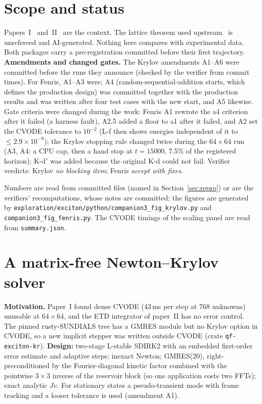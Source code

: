 \documentclass[11pt,a4paper]{article}
\begin{document}
\section{Scope and status}

\begin{keybox}
Papers~I~\cite{CallensI} and~II~\cite{CallensII} are the context. The lattice theorem used upstream~\cite{OpenAI2026} is unrefereed and
AI-generated. Nothing here compares with experimental data. Both packages carry a pre-registration committed before their first
trajectory. \textbf{Amendments and changed gates.} The Krylov amendments A1--A6 were committed before the runs they announce (checked by
the verifier from commit times). For Fenris, A1--A3 were; A4 (random-sequential-addition starts, which defines the production design) was
committed together with the production results and was written after four test cases with the new start, and A5 likewise. Gate criteria
were changed during the work: Fenris A1 rewrote the a4 criterion after it failed (a harness fault), A2.5 added a floor to a1 after it
failed, and A2 set the CVODE tolerance to $10^{-2}$ (L-f then shows energies independent of it to $\le2.9\times10^{-9}$); the Krylov
stopping rule changed twice during the $64\times64$ run (A3, A4: a CPU cap, then a hand stop at $t=15000$, 7.5\% of the registered horizon);
K-d$'$ was added because the original K-d could not fail. Verifier verdicts: Krylov \emph{no blocking item}; Fenris \emph{accept with fixes}.
\end{keybox}

Numbers are read from committed files (named in Section~\ref{sec:repro}) or are the verifiers' recomputations, whose notes are committed; the figures are generated by
\texttt{exploration/exciton/python/companion3\_fig\_krylov.py} and \texttt{companion3\_fig\_fenris.py}. The CVODE timings of the scaling panel are read from \texttt{summary.json}.

\section{A matrix-free Newton--Krylov solver}\label{sec:krylov}

\textbf{Motivation.} Paper~I found dense CVODE (43\,ms per step at 768 unknowns) unusable at $64\times64$, and the ETD integrator of paper~II has no
error control. The pinned rusty-SUNDIALS tree has a GMRES module but no Krylov option in CVODE, so a new implicit stepper was written
outside CVODE (crate \texttt{qf-exciton-kr}). \textbf{Design:} two-stage L-stable SDIRK2 with an embedded first-order error estimate and
adaptive steps; inexact Newton; GMRES(20), right-preconditioned by the Fourier-diagonal kinetic factor combined with the pointwise
$3\times3$ inverse of the reservoir block (so one application costs two FFTs); exact analytic $Jv$. For stationary states a
pseudo-transient mode with frame tracking and a looser tolerance is used (amendment A1).
\end{document}
